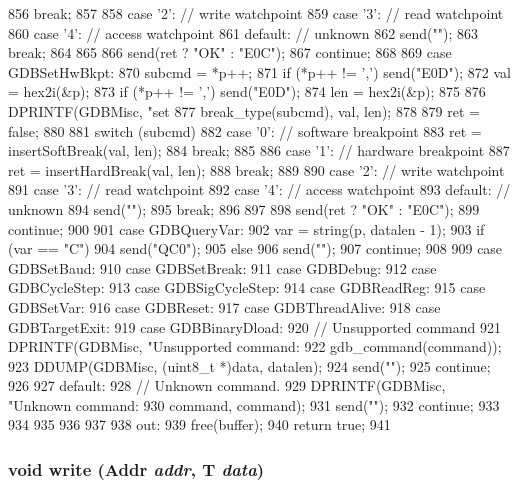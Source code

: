 \begin{DoxyCode}
{{{{856                 break;
857 
858               case '2': // write watchpoint
859               case '3': // read watchpoint
860               case '4': // access watchpoint
861               default: // unknown
862                 send("");
863                 break;
864             }
865 
866             send(ret ? "OK" : "E0C");
867             continue;
868 
869           case GDBSetHwBkpt:
870             subcmd = *p++;
871             if (*p++ != ',') send("E0D");
872             val = hex2i(&p);
873             if (*p++ != ',') send("E0D");
874             len = hex2i(&p);
875 
876             DPRINTF(GDBMisc, "set %
877                     break_type(subcmd), val, len);
878 
879             ret = false;
880 
881             switch (subcmd) {
882               case '0': // software breakpoint
883                 ret = insertSoftBreak(val, len);
884                 break;
885 
886               case '1': // hardware breakpoint
887                 ret = insertHardBreak(val, len);
888                 break;
889 
890               case '2': // write watchpoint
891               case '3': // read watchpoint
892               case '4': // access watchpoint
893               default: // unknown
894                 send("");
895                 break;
896             }
897 
898             send(ret ? "OK" : "E0C");
899             continue;
900 
901           case GDBQueryVar:
902             var = string(p, datalen - 1);
903             if (var == "C")
904                 send("QC0");
905             else
906                 send("");
907             continue;
908 
909           case GDBSetBaud:
910           case GDBSetBreak:
911           case GDBDebug:
912           case GDBCycleStep:
913           case GDBSigCycleStep:
914           case GDBReadReg:
915           case GDBSetVar:
916           case GDBReset:
917           case GDBThreadAlive:
918           case GDBTargetExit:
919           case GDBBinaryDload:
920             // Unsupported command
921             DPRINTF(GDBMisc, "Unsupported command: %
922                     gdb_command(command));
923             DDUMP(GDBMisc, (uint8_t *)data, datalen);
924             send("");
925             continue;
926 
927           default:
928             // Unknown command.
929             DPRINTF(GDBMisc, "Unknown command: %
930                     command, command);
931             send("");
932             continue;
933 
934 
935         }
936     }
937 
938   out:
939     free(buffer);
940     return true;
941 }
\end{DoxyCode}
\hypertarget{classBaseRemoteGDB_a45f7320d5f3976e7a792619ba1fb0798}{
\subsubsection[{write}]{\setlength{\rightskip}{0pt plus 5cm}void write ({\bf Addr} {\em addr}, \/  T {\em data})}}
\label{classBaseRemoteGDB_a45f7320d5f3976e7a792619ba1fb0798}



